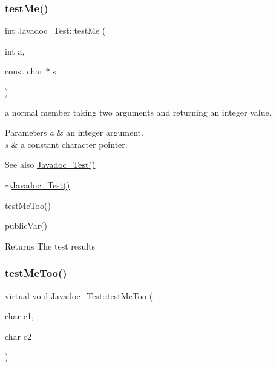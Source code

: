 \subsubsection{\texorpdfstring{testMe()}{testMe()}}
{\footnotesize\ttfamily int Javadoc\+\_\+\+Test\+::test\+Me (\begin{DoxyParamCaption}\item[{int}]{a,  }\item[{const char $\ast$}]{s }\end{DoxyParamCaption})}



a normal member taking two arguments and returning an integer value. 


\begin{DoxyParams}{Parameters}
{\em a} & an integer argument. \\
\hline
{\em s} & a constant character pointer. \\
\hline
\end{DoxyParams}
\begin{DoxySeeAlso}{See also}
\mbox{\hyperlink{class_javadoc___test_a17313327932ae97596b0a455ba8342cc}{Javadoc\+\_\+\+Test()}} 

\mbox{\hyperlink{class_javadoc___test_a60016cd15a4ed82bbc35be79a0a6a6b5}{$\sim$\+Javadoc\+\_\+\+Test()}} 

\mbox{\hyperlink{class_javadoc___test_ac2b39cabbe80957ae3e8bc2bd4e887f6}{test\+Me\+Too()}} 

\mbox{\hyperlink{class_javadoc___test_a44a516fbc3a4865e2dcae34649c9df6a}{public\+Var()}} 
\end{DoxySeeAlso}
\begin{DoxyReturn}{Returns}
The test results 
\end{DoxyReturn}
\mbox{\label{class_javadoc___test_ac2b39cabbe80957ae3e8bc2bd4e887f6}} 
\subsubsection{\texorpdfstring{testMeToo()}{testMeToo()}}
{\footnotesize\ttfamily virtual void Javadoc\+\_\+\+Test\+::test\+Me\+Too (\begin{DoxyParamCaption}\item[{char}]{c1,  }\item[{char}]{c2 }\end{DoxyParamCaption})\hspace{0.3cm}{\ttfamily [pure virtual]}}



